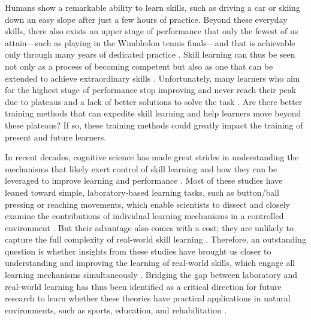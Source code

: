 \newcommand{\RNum}[1]{\uppercase\expandafter{\romannumeral #1\relax}}


Humans show a remarkable ability to learn skills, such as driving a car or skiing down an easy slope after just a few hours of practice. Beyond these everyday skills, there also exists an upper stage of performance that only the fewest of us attain—such as playing in the Wimbledon tennis finals—and that is achievable only through many years of dedicated practice \cite{hodges_predicting_2004, ericsson_role_1993, vaeyens_talent_2009}. Skill learning can thus be seen not only as a process of becoming competent but also as one that can be extended to achieve extraordinary skills \cite{ericsson_development_2003, ericsson_scientific_1998}. 
Unfortunately, many learners who aim for the highest stage of performance stop improving and never reach their peak due to plateaus and a lack of better solutions to solve the task \cite{thorndike_educational_1913, grayloooooong,grayshort,ericsson_scientific_1998, ericsson_development_2003}. Are there better training methods that can expedite skill learning and help learners move beyond these plateaus? If so, these training methods could greatly impact the training of present and future learners. 

In recent decades, cognitive science has made great strides in understanding the mechanisms that likely exert control of skill learning and how they can be leveraged to improve learning and performance \cite{wolpert_principles_2011, makino_circuit_2016, spampinato_multiple_2021, krakauer_motor_2019, haith_model-based_2013, huang_rethinking_2011, shmuelof_are_2011, doya_complementary_2000}. Most of these studies have leaned toward simple, laboratory-based learning tasks\cite{krakauer_motor_2019, du_relationship_2022}, such as button/ball pressing \cite{hardwick_time-dependent_2019, vassiliadis_reward_2021} or reaching movements\cite{shadmehr_adaptive_1994, krakauer_learning_2000},  which enable scientists to dissect and closely examine the contributions of individual learning mechanisms in a controlled environment \cite{spampinato_multiple_2021}. But their advantage also comes with a cost; they are unlikely to capture the full complexity of real-world skill learning \cite{krakauer_motor_2019, mangalam_investigating_2023, du_relationship_2022, chen_effects_2018, wolpert_principles_2011, gallivan_decision-making_2018, iyer_probing_2020, ingram_naturalistic_2011}. Therefore, an outstanding question is whether insights from these studies have brought us closer to understanding and improving the learning of real-world skills, which engage all learning mechanisms simultaneously \cite{spampinato_multiple_2021}. Bridging the gap between laboratory and real-world learning has thus been identified as a critical direction for future research to learn whether these theories have practical applications in natural environments, such as sports, education, and rehabilitation \cite{du_relationship_2022, wolpert_motor_2010, yarrow_inside_2009, haar_motor_2020, ingram_naturalistic_2011}.

